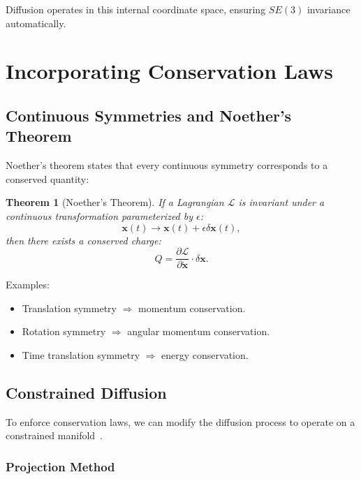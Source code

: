 \documentclass[12pt]{report}
\newtheorem{theorem}{Theorem}[section]
\theoremstyle{definition}
\begin{document}
Diffusion operates in this internal coordinate space, ensuring $SE(3)$ invariance automatically.

\section{Incorporating Conservation Laws}

\subsection{Continuous Symmetries and Noether's Theorem}

Noether's theorem states that every continuous symmetry corresponds to a conserved quantity:

\begin{theorem}[Noether's Theorem]
If a Lagrangian $\mathcal{L}$ is invariant under a continuous transformation parameterized by $\epsilon$:
\begin{equation}
\mathbf{x}(t) \to \mathbf{x}(t) + \epsilon \delta\mathbf{x}(t),
\label{eq:infinitesimal_transform}
\end{equation}
then there exists a conserved charge:
\begin{equation}
Q = \frac{\partial \mathcal{L}}{\partial \dot{\mathbf{x}}} \cdot \delta\mathbf{x}.
\label{eq:conserved_charge}
\end{equation}
\end{theorem}

Examples:
\begin{itemize}
\item Translation symmetry $\Rightarrow$ momentum conservation.
\item Rotation symmetry $\Rightarrow$ angular momentum conservation.
\item Time translation symmetry $\Rightarrow$ energy conservation.
\end{itemize}

\subsection{Constrained Diffusion}

To enforce conservation laws, we can modify the diffusion process to operate on a constrained manifold~\citep{de2021riemannian}.

\subsubsection{Projection Method}
\end{document}
